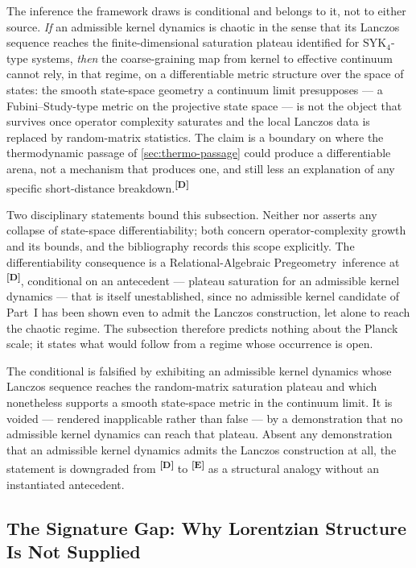 \documentclass[12pt,a4paper,twoside]{article}
\theoremstyle{plain}
\theoremstyle{definition}
\theoremstyle{remark}
\newcommand{\ProjectShort}{Relational-Algebraic Pregeometry}
\newcommand{\RAP}{\ProjectShort}
\newcommand{\catmark}[1]{\textsuperscript{\textsf{\textbf{[#1]}}}}
\begin{document}
The inference the framework draws is conditional and belongs to it, not to
either source. \emph{If} an admissible kernel dynamics is chaotic in the
sense that its Lanczos sequence reaches the finite-dimensional saturation
plateau identified for $\mathrm{SYK}_4$-type systems, \emph{then} the
coarse-graining map from kernel to effective continuum cannot rely, in that
regime, on a differentiable metric structure over the space of states: the
smooth state-space geometry a continuum limit presupposes --- a
Fubini--Study-type metric on the projective state space --- is not the
object that survives once operator complexity saturates and the local
Lanczos data is replaced by random-matrix statistics. The claim is a
boundary on where the thermodynamic passage of \cref{sec:thermo-passage}
could produce a differentiable arena, not a mechanism that produces one,
and still less an explanation of any specific short-distance
breakdown.\catmark{D}

Two disciplinary statements bound this subsection. Neither
\cite{parker2019} nor \cite{rabinovici2021} asserts any collapse of
state-space differentiability; both concern operator-complexity growth and
its bounds, and the bibliography records this scope explicitly. The
differentiability consequence is a \RAP\ inference at \catmark{D},
conditional on an antecedent --- plateau saturation for an admissible
kernel dynamics --- that is itself unestablished, since no admissible
kernel candidate of Part~I has been shown even to admit the Lanczos
construction, let alone to reach the chaotic regime. The subsection
therefore predicts nothing about the Planck scale; it states what would
follow from a regime whose occurrence is open.

\begin{killswitch}
The conditional is falsified by exhibiting an admissible kernel dynamics
whose Lanczos sequence reaches the random-matrix saturation plateau and
which nonetheless supports a smooth state-space metric in the continuum
limit. It is voided --- rendered inapplicable rather than false --- by a
demonstration that no admissible kernel dynamics can reach that plateau.
Absent any demonstration that an admissible kernel dynamics admits the
Lanczos construction at all, the statement is downgraded from \catmark{D}
to \catmark{E} as a structural analogy without an instantiated antecedent.
\end{killswitch}

\subsection{The Signature Gap: Why Lorentzian Structure Is Not Supplied}
\label{subsec:signature-gap}
\end{document}
